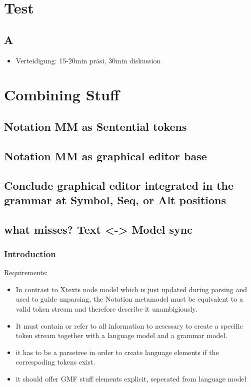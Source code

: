 \chapter{Test}
\section{A}
\begin{itemize}
	\item Verteidigung: 15-20min präsi, 30min diskussion
\end{itemize}
	





\chapter{Combining Stuff}
\section{Notation MM as Sentential tokens}
\section{Notation MM as graphical editor base}
\section{Conclude graphical editor integrated in the grammar at Symbol, Seq, or Alt positions}
\section{what misses? Text <-> Model sync}





\subsection{Introduction}
Requirements:
\begin{itemize}
	\item In contrast to Xtexts node model which is just updated during parsing and used to guide unparsing, the Notation metamodel must be equivalent to a valid token stream and therefore describe it unambigiously. 
	\item It must contain or refer to all information to nesessary to create a specific token stream together with a language model and a grammar model.   
	\item it has to be a parsetree in order to create language elements if the correspoding tokens exist.
	\item it should offer GMF stuff elements 
	explicit, seperated from language model
\end{itemize}





